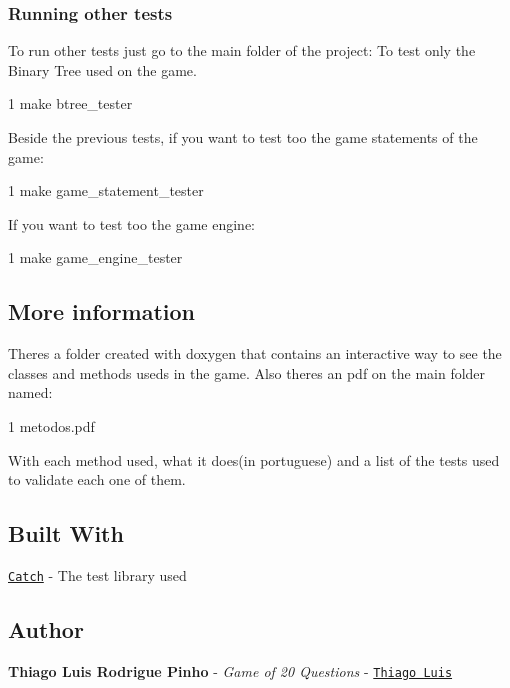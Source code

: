\subsubsection*{Running other tests}

To run other tests just go to the main folder of the project\+: To test only the Binary Tree used on the game. 
\begin{DoxyCode}
1 make btree\_tester
\end{DoxyCode}


Beside the previous tests, if you want to test too the game statements of the game\+: 
\begin{DoxyCode}
1 make game\_statement\_tester
\end{DoxyCode}


If you want to test too the game engine\+: 
\begin{DoxyCode}
1 make game\_engine\_tester
\end{DoxyCode}
 \subsection*{More information}

There\textquotesingle{}s a folder created with doxygen that contains an interactive way to see the classes and methods useds in the game. Also there\textquotesingle{}s an pdf on the main folder named\+: 
\begin{DoxyCode}
1 metodos.pdf
\end{DoxyCode}
 With each method used, what it does(in portuguese) and a list of the tests used to validate each one of them. \subsection*{Built With}


\begin{DoxyItemize}
\item \href{http://catch-lib.net/}{\tt Catch} -\/ The test library used
\end{DoxyItemize}

\subsection*{Author}


\begin{DoxyItemize}
\item {\bfseries Thiago Luis Rodrigue Pinho} -\/ {\itshape Game of 20 Questions} -\/ \href{https://github.com/thiagolrpinho}{\tt Thiago Luis}
\end{DoxyItemize}

